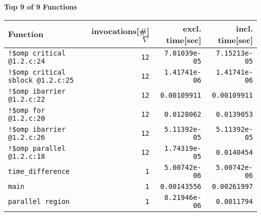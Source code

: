 \documentclass[a4paper,10pt]{article}
\begin{document}
\begin{center}\small
{\Large \bf Top 9 of 9 Functions}
\bigskip
\begin{longtable}{|l||r|r|r|}

   \hline
   \bf Function & \bf invocations[\#] $\nabla$ & \bf excl. time[sec] & \bf incl. time[sec] \\
   \hline\hline
  \verb|!$omp critical @1.2.c:24| &   \verb|12| &   \verb|7.01039e-05| &   \verb|7.15213e-05| \\
  \verb|!$omp critical sblock @1.2.c:25| &   \verb|12| &   \verb|1.41741e-06| &   \verb|1.41741e-06| \\
  \verb|!$omp ibarrier @1.2.c:22| &   \verb|12| &   \verb|0.00109911| &   \verb|0.00109911| \\
      \hline
  \verb|!$omp for @1.2.c:20| &   \verb|12| &   \verb|0.0128062| &   \verb|0.0139053| \\
  \verb|!$omp ibarrier @1.2.c:26| &   \verb|12| &   \verb|5.11392e-05| &   \verb|5.11392e-05| \\
  \verb|!$omp parallel @1.2.c:18| &   \verb|12| &   \verb|1.74319e-05| &   \verb|0.0140454| \\
      \hline
  \verb|time_difference| &   \verb|1| &   \verb|5.00742e-06| &   \verb|5.00742e-06| \\
  \verb|main| &   \verb|1| &   \verb|0.00143556| &   \verb|0.00261997| \\
  \verb|parallel region| &   \verb|1| &   \verb|8.21946e-06| &   \verb|0.0011794| \\
   \hline
\end{longtable}

\end{center}
\newpage

\newpage
\end{document}
